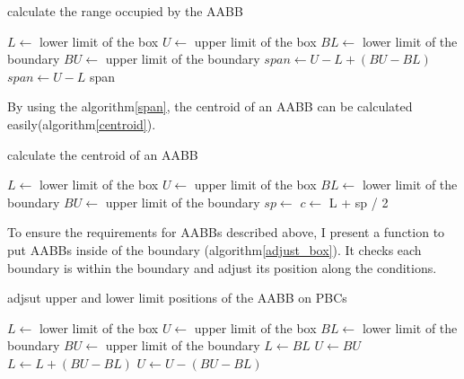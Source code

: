 \documentclass[10pt,letterpaper,twocolumn]{article}
\begin{document}
\begin{algorithm}
    \caption{calculate the range occupied by the AABB}
    \label{span}
    \begin{algorithmic}
        \State $L  \gets$ lower limit of the box
        \State $U  \gets$ upper limit of the box
        \State $BL \gets$ lower limit of the boundary
        \State $BU \gets$ upper limit of the boundary
                \State $span \gets U - L + (BU - BL)$
            \Else
                \State $span \gets U - L$
            \EndIf
            \State \Return span
        \EndFunction
    \end{algorithmic}
\end{algorithm}

By using the algorithm\ref{span}, the centroid of an AABB can be calculated
easily(algorithm\ref{centroid}).

\begin{algorithm}
    \caption{calculate the centroid of an AABB}
    \label{centroid}
    \begin{algorithmic}
        \State $L  \gets$ lower limit of the box
        \State $U  \gets$ upper limit of the box
        \State $BL \gets$ lower limit of the boundary
        \State $BU \gets$ upper limit of the boundary
            \State $sp \gets$ 
            \State $c  \gets$ L + sp / 2
            \State \Return {}
        \EndFunction
    \end{algorithmic}
\end{algorithm}

To ensure the requirements for AABBs described above, I present a function to
put AABBs inside of the boundary (algorithm\ref{adjust_box}). It checks each
boundary is within the boundary and adjust its position along the conditions.

\begin{algorithm}
    \caption{adjsut upper and lower limit positions of the AABB on PBCs}
    \label{adjust_box}
    \begin{algorithmic}
        \State $L  \gets$ lower limit of the box
        \State $U  \gets$ upper limit of the box
        \State $BL \gets$ lower limit of the boundary
        \State $BU \gets$ upper limit of the boundary
                \State $L \gets BL$
                \State $U \gets BU$
                \State $L \gets L + (BU - BL)$
                \State $U \gets U - (BU - BL)$
            \EndIf
            \State \Return
        \EndFunction
     \end{algorithmic}
\end{algorithm}
\end{document}
